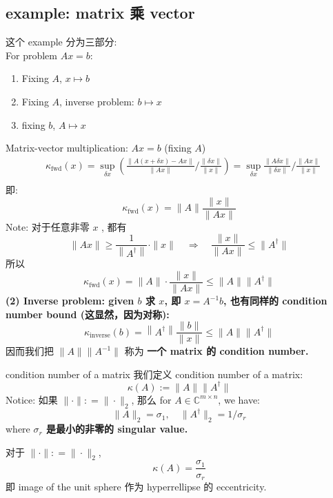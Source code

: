 \documentclass[lang=cn,11pt]{elegantbook}
\begin{document}
\subsection{example: matrix 乘 vector}
这个 example 分为三部分: \\
For problem $Ax = b$:
\begin{enumerate}
    \item Fixing $A$, $x\mapsto b$
    \item Fixing $A$, inverse problem: $b \mapsto x$
    \item fixing $b$, $A\mapsto x$
\end{enumerate}
\begin{example}
    Matrix-vector multiplication: $Ax = b$ (fixing $A$)
$$
\begin{aligned}
&\kappa_{\mathrm{fwd}}(x)=\sup _{\delta x}\left(\frac{\|A(x+\delta x)-A x\|}{\|A x\|} / \frac{\|\delta x\|}{\|x\|}\right)=\sup _{\delta x} \frac{\|A \delta x\|}{\|\delta x\|} / \frac{\|A x\|}{\|x\|}\\
\end{aligned}
$$  即:\[
\kappa_{\mathrm{fwd}}(x)=\|A\| \frac{\|x\|}{\|A x\|}
\]
Note: 对于任意非零 $x$ , 都有
$$
\|A x\| \geq \frac{1}{\left\|A^{\dagger}\right\|} \cdot\|x\| \quad \Longrightarrow \quad \frac{\|x\|}{\|A x\|} \leq\|A^{\dagger}\|
$$所以 $$
\kappa_{\mathrm{fwd}}(x)=\|A\| \cdot \frac{\|x\|}{\|A x\|} \leq\|A\| \|A^{\dagger}\|
$$
\textbf{(2) Inverse problem: given $b$ 求 $x$, 即 $x = A^{-1} b$, 也有同样的 condition number bound (这显然，因为对称):} $$
\kappa_{\mathrm{inverse}}(b)=\left\|A^{\dagger}\right\| \frac{\|b\|}{\|x\|} \leq \|A\| \|A^{\dagger}\|
$$ 因而我们把 $\|A\| \|A^{-1}\| $ 称为 \textbf{一个 matrix 的 condition number.}
\begin{definition}{condition number of a matrix}
我们定义 condition number of a matrix: \[
    \kappa(A) := \|A\| \|A^{\dagger}\|
    \]
Notice: 如果 $\| \cdot \| : = \|\cdot \|_2$, 那么 for $A \in \mathbb{C}^{m\times n}$, we have: \[
\| A \|_2 = \sigma_1,\quad \| A ^{\dagger} \|_2 = 1/\sigma_r
\]where\textbf{ $\sigma_r$ 是最小的非零的 singular value.}
\end{definition}
对于 $\| \cdot \| : = \|\cdot \|_2$, \[
 \kappa(A) = \frac{\sigma_1}{\sigma_r}
\]即 image of the unit sphere 作为 hyperrellipse 的 eccentricity.
\end{example}
\end{document}
